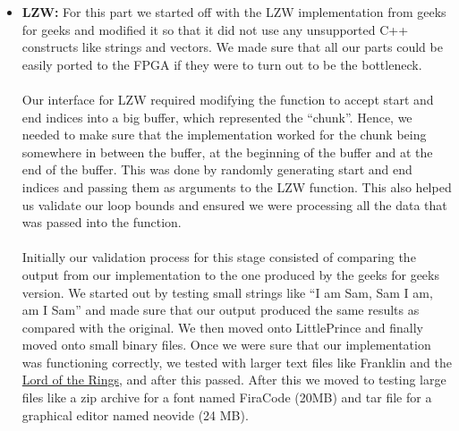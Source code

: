 \documentclass[../main.tex]{subfiles}
\begin{document}
\begin{enumerate}
\begin{itemize}
        \item \textbf{LZW:}  For this part we started off with the LZW implementation from geeks for geeks and modified it so that it did not use any unsupported C++ constructs like strings and vectors. We made sure that all our parts could be easily ported to the FPGA if they were to turn out to be the bottleneck. \\ \\
        Our interface for LZW required modifying the function to accept start and end indices into a big buffer, which represented the “chunk”. Hence, we needed to make sure that the implementation worked for the chunk being somewhere in between the buffer, at the beginning of the buffer and at the end of the buffer. This was done by randomly generating start and end indices and passing them as arguments to the LZW function. This also helped us validate our loop bounds and ensured we were processing all the data that was passed into the function.\\ \\
        Initially our validation process for this stage consisted of comparing the output from our implementation to the one produced by the geeks for geeks version. We started out by testing small strings like “I am Sam, Sam I am, am I Sam” and made sure that our output produced the same results as compared with the original. We then moved onto LittlePrince and finally moved onto small binary files. Once we were sure that our implementation was functioning correctly, we tested with larger text files like Franklin and the \href{https://github.com/wess/iotr/blob/master/lotr.txt}{Lord of the Rings}, and after this passed. After this we moved to testing large files like a zip archive for a font named FiraCode (20MB) and tar file for a graphical editor named neovide (24 MB).
    \end{itemize}


\end{enumerate}
\end{document}
